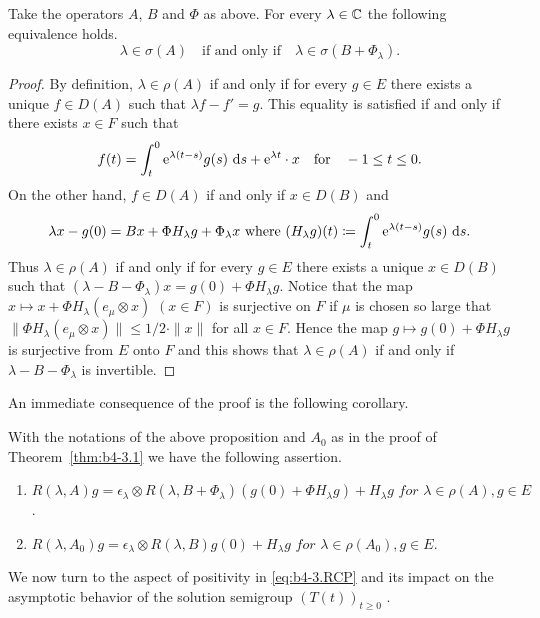 \begin{proposition}\label{prop:b4-3.4}
%
%
	Take the operators $A$, $B$ and $\Phi$ as above. 
    For every $\lambda \in \mathbb{C}$ the following equivalence holds. 
	\begin{equation}\label{eq:b4-3.4}
		\lambda \in \sigma(A) \quad \text{if and only if} \quad \lambda \in \sigma(B + \Phi_\lambda).
	\end{equation}
\end{proposition}
\begin{proof} By definition, $\lambda \in \rho(A)$ if and only if for every $g \in E$ there exists a unique $f \in D(A)$ such that $\lambda f - f' = g$. 
This equality is satisfied if and only if there exists $x \in F$ such that
\[
f(t) = \int_t^0 \mathrm{e}^{\lambda(t-s)} g(s) \,\mathop{}\!\mathrm{d}{s} + \mathrm{e}^{\lambda t} \cdot x \quad \text{for} \quad -1 \leq t \leq 0   .
\]
On the other hand, $f \in D(A)$ if and only if $x \in D(B)$ and
\[
\text{$\lambda x - g(0) = Bx + \Phi H_\lambda g + \Phi_\lambda x$ where $(H_\lambda g)(t) \coloneq  \int_t^0 \mathrm{e}^{\lambda(t-s)} g(s) \,\mathop{}\!\mathrm{d}{s} .$}
\]
Thus $\lambda \in \rho(A)$ if and only if for every $g \in E$ there exists a unique $x \in D(B)$ such that $(\lambda - B - \Phi_\lambda)x = g(0) + \Phi H_\lambda g$. 
Notice that the map $x \mapsto x + \Phi H_\lambda(e_\mu \otimes x)$ $(x \in F)$ is surjective on $F$ if $\mu$ is chosen so large that $\|\Phi H_\lambda(e_\mu \otimes x)\| \leq 1/2 \cdot \|x\|$ for all $x \in F$. 
Hence the map $g \mapsto g(0) + \Phi H_\lambda g$ is surjective from $E$ onto $F$ and this shows that $\lambda \in \rho(A)$ if and only if $\lambda - B - \Phi_\lambda$ is invertible.
\end{proof}
An immediate consequence of the proof is the following corollary.

\begin{corollary*}
With the notations of the above proposition and $A_{0}$ as in the proof of Theorem~\ref{thm:b4-3.1} we have the following assertion.
\begin{enumerate}[\upshape (i)]
	\item  
	$R(\lambda,A)g = \epsilon_\lambda \otimes R(\lambda,B+\Phi_\lambda)(g(0)+\Phi H_\lambda g) + H_\lambda g \textit{ for } \lambda \in \rho(A), g \in E$.

	\item 
	$R(\lambda,A_{0})g = \epsilon_\lambda \otimes R(\lambda,B)g(0) + H_\lambda g \textit{ for }  \lambda \in \rho(A_{0}), g \in E$.
\end{enumerate}
\end{corollary*}
We now turn to the aspect of positivity in \eqref{eq:b4-3.RCP} and its impact on the asymptotic behavior of the solution semigroup $(T(t))_{t \geq 0}$ .

